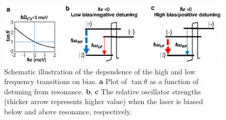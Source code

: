 \documentclass[10pt,letterpaper]{article}%
\begin{document}
\begin{appendices}
\begin{figure}[h]
\begin{center}
\includegraphics[scale=0.9]{figs/BIASDETUNING.eps}
\end{center}
\caption{ Schematic illustration of the dependence of the high and low
frequency transitions on bias. \textbf{a} Plot of $\tan\theta$ as a
function of detuning from resonance. \textbf{b}, \textbf{c} The relative
oscillator strengths (thicker arrow represents higher value) when the laser is
biased below and above resonance, respectively. }%
\label{fig:img08}%
\end{figure}%

\end{appendices}%
\end{document}
